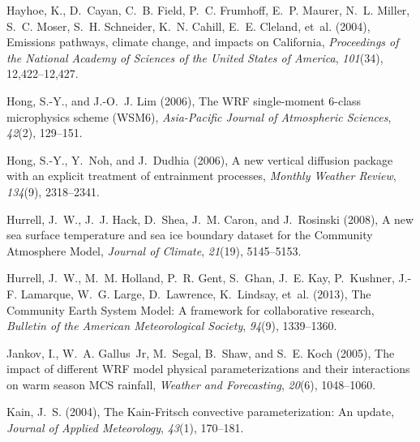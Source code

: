\documentclass[draft,ms]{agutex}   %
\begin{document}
\begin{article}
\begin{thebibliography}{72}
Hayhoe, K., D.~Cayan, C.~B. Field, P.~C. Frumhoff, E.~P. Maurer, N.~L. Miller,
  S.~C. Moser, S.~H. Schneider, K.~N. Cahill, E.~E. Cleland, et~al. (2004),
  {Emissions pathways, climate change, and impacts on California},
  \textit{Proceedings of the National Academy of Sciences of the United States
  of America}, \textit{101}(34), 12,422--12,427.

Hong, S.-Y., and J.-O.~J. Lim (2006), {The WRF single-moment 6-class
  microphysics scheme (WSM6)}, \textit{Asia-Pacific Journal of Atmospheric
  Sciences}, \textit{42}(2), 129--151.

Hong, S.-Y., Y.~Noh, and J.~Dudhia (2006), A new vertical diffusion package
  with an explicit treatment of entrainment processes, \textit{Monthly Weather
  Review}, \textit{134}(9), 2318--2341.

Hurrell, J.~W., J.~J. Hack, D.~Shea, J.~M. Caron, and J.~Rosinski (2008), {A
  new sea surface temperature and sea ice boundary dataset for the Community
  Atmosphere Model}, \textit{Journal of Climate}, \textit{21}(19), 5145--5153.

Hurrell, J.~W., M.~M. Holland, P.~R. Gent, S.~Ghan, J.~E. Kay, P.~Kushner,
  J.-F. Lamarque, W.~G. Large, D.~Lawrence, K.~Lindsay, et~al. (2013), {The
  Community Earth System Model: A framework for collaborative research},
  \textit{Bulletin of the American Meteorological Society}, \textit{94}(9),
  1339--1360.

Jankov, I., W.~A. Gallus~Jr, M.~Segal, B.~Shaw, and S.~E. Koch (2005), {The
  impact of different WRF model physical parameterizations and their
  interactions on warm season MCS rainfall}, \textit{Weather and Forecasting},
  \textit{20}(6), 1048--1060.

Kain, J.~S. (2004), {The Kain-Fritsch convective parameterization: An update},
  \textit{Journal of Applied Meteorology}, \textit{43}(1), 170--181.


\end{thebibliography}
\end{article}
\end{document}

